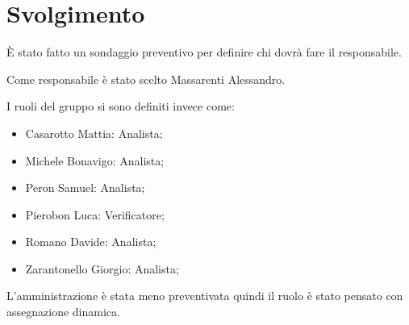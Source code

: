 \section{Svolgimento}

È stato fatto un sondaggio preventivo per definire chi dovrà fare il responsabile.

Come responsabile è stato scelto Massarenti Alessandro.

I ruoli del gruppo si sono definiti invece come:
\begin{itemize}
    \item Casarotto Mattia: Analista;
    \item Michele Bonavigo: Analista;
    \item Peron Samuel: Analista;
    \item Pierobon Luca: Verificatore;
    \item Romano Davide: Analista;
    \item Zarantonello Giorgio: Analista;
\end{itemize}

L'amministrazione è stata meno preventivata quindi il ruolo è stato pensato con assegnazione dinamica.
